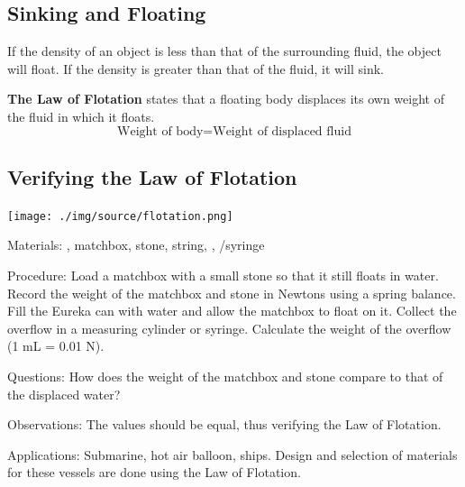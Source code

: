 \begin{multicols}{2}

\section*{Sinking and Floating}
If the density of an object is less than that of the surrounding fluid, the object will float. If the density is greater than that of the fluid, it will sink.

\textbf{The Law of Flotation} states that a floating body displaces its own weight of the fluid in which it floats.
$$\text{Weight of body} = \text{Weight of displaced fluid}$$


\subsection{Verifying the Law of Flotation}

\begin{center}
\texttt{[image: ./img/source/flotation.png]}
\end{center}

\begin{description*}
\item[Materials:]{, matchbox, stone, string, , /syringe}
\item[Procedure:]{Load a matchbox with a small stone so that it still floats in water. Record the weight of the matchbox and stone in Newtons using a spring balance. Fill the Eureka can with water and allow the matchbox to float on it. Collect the overflow in a measuring cylinder or syringe. Calculate the weight of the overflow (1 mL = 0.01 N).}
\item[Questions:]{How does the weight of the matchbox and stone compare to that of the displaced water?}
\item[Observations:]{The values should be equal, thus verifying the Law of Flotation.}
\item[Applications:]{Submarine, hot air balloon, ships. Design and selection of materials for these vessels are done using the Law of Flotation.}
\end{description*}


\end{multicols}

